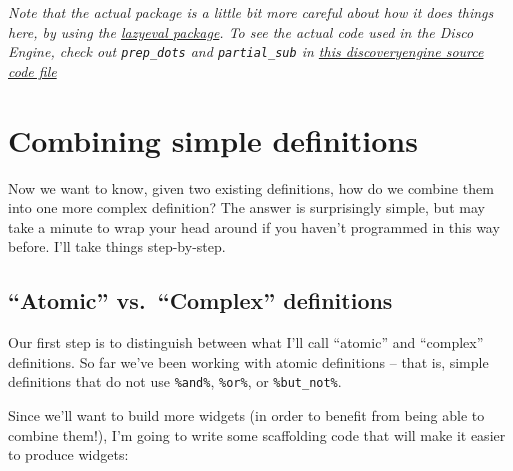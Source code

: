 \documentclass[]{book}
\begin{document}
\emph{Note that the actual package is a little bit more careful about how it does things here, by using the \href{https://cran.r-project.org/web/packages/lazyeval/index.html}{lazyeval package}. To see the actual code used in the Disco Engine, check out \texttt{prep\_dots} and \texttt{partial\_sub} in \href{https://github.com/cwolfsonseeley/discoveryengine/blob/master/R/helper-utils.R}{this discoveryengine source code file}}

\hypertarget{combining-simple-definitions}{%
\section{Combining simple definitions}\label{combining-simple-definitions}}

Now we want to know, given two existing definitions, how do we combine them into one more complex definition? The answer is surprisingly simple, but may take a minute to wrap your head around if you haven't programmed in this way before. I'll take things step-by-step.

\hypertarget{atomic-vs.-complex-definitions}{%
\subsection{``Atomic'' vs.~``Complex'' definitions}\label{atomic-vs.-complex-definitions}}

Our first step is to distinguish between what I'll call ``atomic'' and ``complex'' definitions. So far we've been working with atomic definitions -- that is, simple definitions that do not use \texttt{\%and\%}, \texttt{\%or\%}, or \texttt{\%but\_not\%}.

Since we'll want to build more widgets (in order to benefit from being able to combine them!), I'm going to write some scaffolding code that will make it easier to produce widgets:
\end{document}
